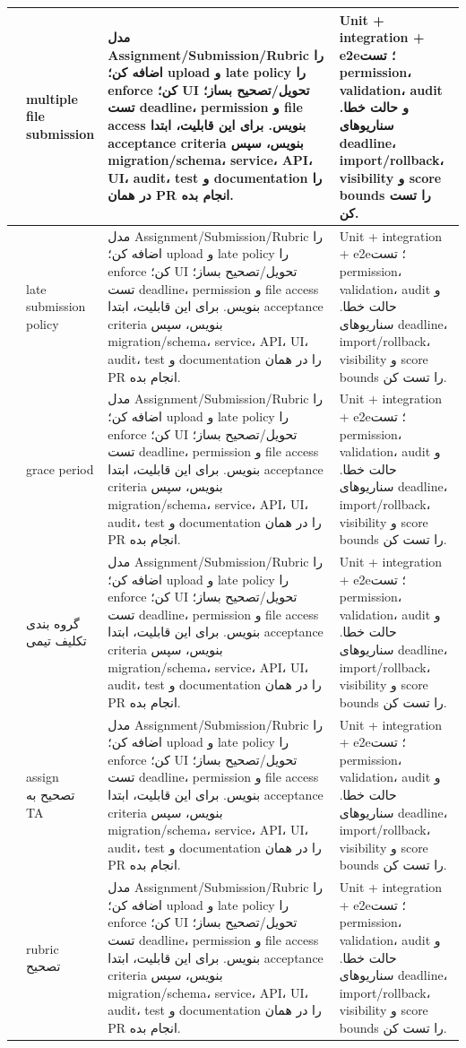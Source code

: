 \documentclass[11pt,a4paper]{article}
\begin{document}
\begin{longtable}{|>{\raggedleft\arraybackslash}p{}|>{\raggedleft\arraybackslash}p{}|>{\raggedleft\arraybackslash}p{}|>{\raggedleft\arraybackslash}p{}|}
105 & multiple file submission & مدل Assignment/Submission/Rubric را اضافه کن؛ upload و late policy را enforce کن؛ UI تحویل/تصحیح بساز؛ تست deadline، permission و file access بنویس. برای این قابلیت، ابتدا acceptance criteria بنویس، سپس migration/schema، service، API، UI، audit، test و documentation را در همان PR انجام بده. & Unit + integration + e2e؛ تست permission، validation، audit و حالت خطا. سناریوهای deadline، import/rollback، visibility و score bounds را تست کن. \\ \hline
106 & late submission policy & مدل Assignment/Submission/Rubric را اضافه کن؛ upload و late policy را enforce کن؛ UI تحویل/تصحیح بساز؛ تست deadline، permission و file access بنویس. برای این قابلیت، ابتدا acceptance criteria بنویس، سپس migration/schema، service، API، UI، audit، test و documentation را در همان PR انجام بده. & Unit + integration + e2e؛ تست permission، validation، audit و حالت خطا. سناریوهای deadline، import/rollback، visibility و score bounds را تست کن. \\ \hline
107 & grace period & مدل Assignment/Submission/Rubric را اضافه کن؛ upload و late policy را enforce کن؛ UI تحویل/تصحیح بساز؛ تست deadline، permission و file access بنویس. برای این قابلیت، ابتدا acceptance criteria بنویس، سپس migration/schema، service، API، UI، audit، test و documentation را در همان PR انجام بده. & Unit + integration + e2e؛ تست permission، validation، audit و حالت خطا. سناریوهای deadline، import/rollback، visibility و score bounds را تست کن. \\ \hline
108 & گروه بندی تکلیف تیمی & مدل Assignment/Submission/Rubric را اضافه کن؛ upload و late policy را enforce کن؛ UI تحویل/تصحیح بساز؛ تست deadline، permission و file access بنویس. برای این قابلیت، ابتدا acceptance criteria بنویس، سپس migration/schema، service، API، UI، audit، test و documentation را در همان PR انجام بده. & Unit + integration + e2e؛ تست permission، validation، audit و حالت خطا. سناریوهای deadline، import/rollback، visibility و score bounds را تست کن. \\ \hline
109 & assign تصحیح به TA & مدل Assignment/Submission/Rubric را اضافه کن؛ upload و late policy را enforce کن؛ UI تحویل/تصحیح بساز؛ تست deadline، permission و file access بنویس. برای این قابلیت، ابتدا acceptance criteria بنویس، سپس migration/schema، service، API، UI، audit، test و documentation را در همان PR انجام بده. & Unit + integration + e2e؛ تست permission، validation، audit و حالت خطا. سناریوهای deadline، import/rollback، visibility و score bounds را تست کن. \\ \hline
110 & rubric تصحیح & مدل Assignment/Submission/Rubric را اضافه کن؛ upload و late policy را enforce کن؛ UI تحویل/تصحیح بساز؛ تست deadline، permission و file access بنویس. برای این قابلیت، ابتدا acceptance criteria بنویس، سپس migration/schema، service، API، UI، audit، test و documentation را در همان PR انجام بده. & Unit + integration + e2e؛ تست permission، validation، audit و حالت خطا. سناریوهای deadline، import/rollback، visibility و score bounds را تست کن. \\ \hline

\end{longtable}
\end{document}
